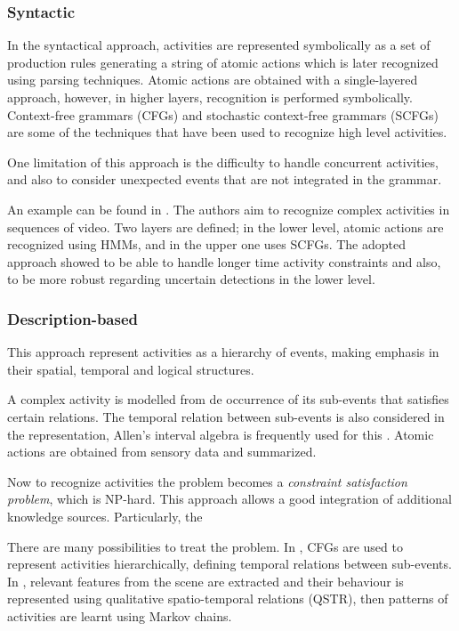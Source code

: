 \subsubsection{Syntactic}
In the syntactical approach, activities are represented symbolically as a set of production rules generating a string of atomic actions which is later recognized using parsing techniques.
Atomic actions are obtained with a single-layered approach, however, in higher layers, recognition is performed symbolically.
Context-free grammars (CFGs) and stochastic context-free grammars (SCFGs) are some of the techniques that have been used to recognize high level activities.

One limitation of this approach is the difficulty to handle concurrent activities, and also to consider unexpected events that are not integrated in the grammar.

An example can be found in \citep{Ivanov2000_RecVisActSCFG}.
The authors aim to recognize complex activities in sequences of video.
Two layers are defined; in the lower level, atomic actions are recognized using HMMs, and in the upper one uses SCFGs.
The adopted approach showed to be able to handle longer time activity constraints and also, to be more robust regarding uncertain detections in the lower level.


\subsubsection{Description-based} \label{sec_description_ap}
This approach represent activities as a hierarchy of events, making emphasis in their spatial, temporal and logical structures.

A complex activity is modelled from de occurrence of its sub-events that satisfies certain relations.
The temporal relation between sub-events is also considered in the representation, Allen's interval algebra is frequently used for this \citep{Allen83_MaintainingKnowledgeTemporal}.
Atomic actions are obtained from sensory data and summarized. %

Now to recognize activities the problem becomes a \textit{constraint satisfaction problem}, which is NP-hard.
This approach allows a good integration of additional knowledge sources. 
Particularly, the 

There are many possibilities to treat the problem. In \citep{Nevatia2004_OntoVidEvRep,Ryoo2006_RecHuAcCFG}, CFGs are used to represent activities hierarchically, defining temporal relations between sub-events. 
In \citep{Sridhar10_UnsupervisedLearning}, relevant features from the scene are extracted and their behaviour is represented using qualitative spatio-temporal relations (QSTR), then patterns of activities are learnt using Markov chains.


